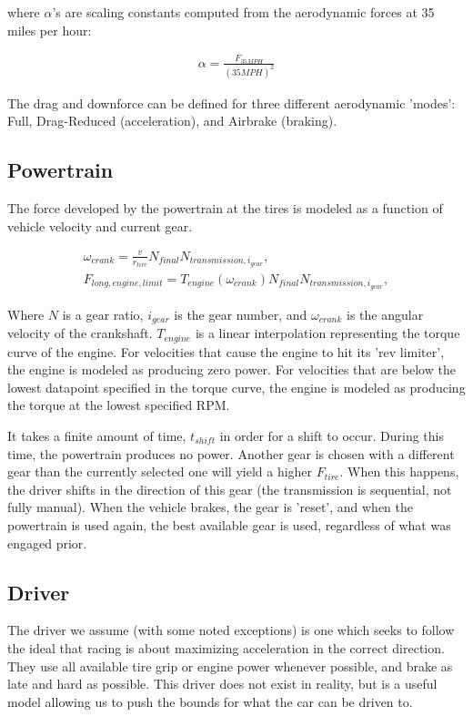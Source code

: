 \documentclass{article}
\begin{document}
where $\alpha$'s are scaling constants computed from the aerodynamic forces at 35 miles per hour:

\begin{align}
	\alpha = \frac{F_{35 MPH}}{(35 MPH)^2}
\end{align}

The drag and downforce can be defined for three different aerodynamic 'modes': Full, Drag-Reduced (acceleration), and Airbrake (braking).

\subsection{Powertrain}

The force developed by the powertrain at the tires is modeled as a function of vehicle velocity and current gear.

\begin{align}
	\omega_{crank} = \frac{v}{r_{tire}} N_{final} N_{transmission,i_{gear}}, \\
	F_{long,engine,limit} = T_{engine}(\omega_{crank}) N_{final} N_{transmission,i_{gear}},
\end{align}

Where $N$ is a gear ratio, $i_{gear}$ is the gear number, and $\omega_{crank}$ is the angular velocity of the crankshaft. $T_{engine}$ is a linear interpolation representing the torque curve of the engine. For velocities that cause the engine to hit its 'rev limiter', the engine is modeled as producing zero power. For velocities that are below the lowest datapoint specified in the torque curve, the engine is modeled as producing the torque at the lowest specified RPM.

It takes a finite amount of time, $t_{shift}$ in order for a shift to occur. During this time, the powertrain produces no power. Another gear is chosen with a different gear than the currently selected one will yield a higher $F_{tire}$. When this happens, the driver shifts in the direction of this gear (the transmission is sequential, not fully manual). When the vehicle brakes, the gear is 'reset', and when the powertrain is used again, the best available gear is used, regardless of what was engaged prior.


\subsection{Driver}

The driver we assume (with some noted exceptions) is one which seeks to follow the ideal that racing is about maximizing acceleration in the correct direction. They use all available tire grip or engine power whenever possible, and brake as late and hard as possible. This driver does not exist in reality, but is a useful model allowing us to push the bounds for what the car can be driven to.
\end{document}
